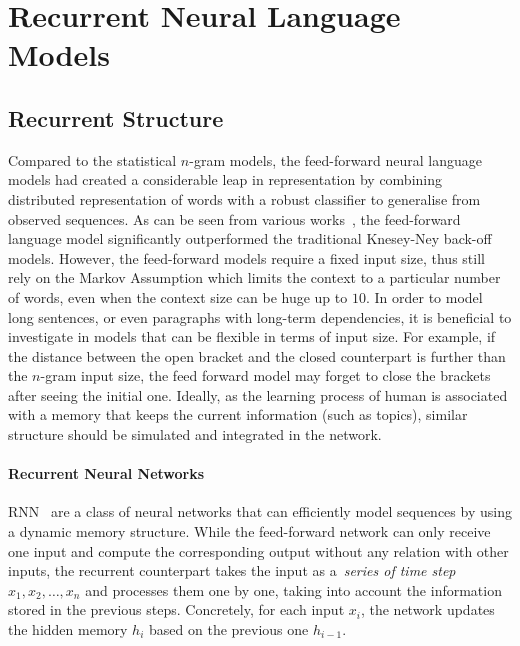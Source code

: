 


\section{Recurrent Neural Language Models}

\subsection{Recurrent Structure}

Compared to the statistical $n$-gram models, the feed-forward neural language models had created a considerable leap in representation by combining distributed representation of words with a robust classifier to generalise from observed sequences. As can be seen from various works~\cite{schwenk2007continuous,le2011structured}, the feed-forward language model significantly outperformed the traditional Knesey-Ney back-off models. However, the feed-forward models require a fixed input size, thus still rely on the Markov Assumption which limits the context to a particular number of words, even when the context size can be huge up to $10$. In order to model long sentences, or even paragraphs with long-term dependencies, it is beneficial to investigate in models that can be flexible in terms of input size. For example, if the distance between the open bracket and the closed counterpart is further than the $n$-gram input size, the feed forward model may forget to close the brackets after seeing the initial one. Ideally, as the learning process of human is associated with a memory that keeps the current information (such as topics), similar structure should be simulated and integrated in the network.

\paragraph{Recurrent Neural Networks} RNN~\cite{elman1990finding} are a class of neural networks that can efficiently model sequences by using a dynamic memory structure. While the feed-forward network can only receive one input and compute the corresponding output without any relation with other inputs, the recurrent counterpart takes the input as a~\textit{series of time step}  $x_1, x_2, \dots, x_n$ and processes them one by one, taking into account the information stored in the previous steps. Concretely, for each input $x_i$, the network updates the hidden memory $h_i$ based on the previous one $h_{i-1}$. 

